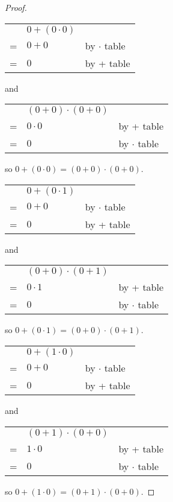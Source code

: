\documentclass[14pt]{extarticle}
\newcommand{\cy}{\color{cyan}}
\begin{document}
\begin{proof}
  \begin{tabular}{cll}
      & \(0 + (0 \cdot 0)\) &                        \\
    = & \(0 + 0\)           & {\cy by $\cdot$ table} \\
    = & \(0\)               & {\cy by + table}
  \end{tabular}
  and
  \begin{tabular}{cll}
      & \((0 + 0) \cdot (0 + 0)\) &                        \\
    = & \(0 \cdot 0\)             & {\cy by + table}       \\
    = & \(0\)                     & {\cy by $\cdot$ table}
  \end{tabular}

  so \(0 + (0 \cdot 0) = (0 + 0) \cdot (0 + 0)\).

  \begin{tabular}{cll}
      & \(0 + (0 \cdot 1)\) &                        \\
    = & \(0 + 0\)           & {\cy by $\cdot$ table} \\
    = & \(0\)               & {\cy by + table}
  \end{tabular}
  and
  \begin{tabular}{cll}
      & \((0 + 0) \cdot (0 + 1)\) &                        \\
    = & \(0 \cdot 1\)             & {\cy by + table}       \\
    = & \(0\)                     & {\cy by $\cdot$ table}
  \end{tabular}

  so \(0 + (0 \cdot 1) = (0 + 0) \cdot (0 + 1)\).

  \begin{tabular}{cll}
      & \(0 + (1 \cdot 0)\) &                        \\
    = & \(0 + 0\)           & {\cy by $\cdot$ table} \\
    = & \(0\)               & {\cy by + table}
  \end{tabular}
  and
  \begin{tabular}{cll}
      & \((0 + 1) \cdot (0 + 0)\) &                        \\
    = & \(1 \cdot 0\)             & {\cy by + table}       \\
    = & \(0\)                     & {\cy by $\cdot$ table}
  \end{tabular}

  so \(0 + (1 \cdot 0) = (0 + 1) \cdot (0 + 0)\).


\end{proof}
\end{document}
